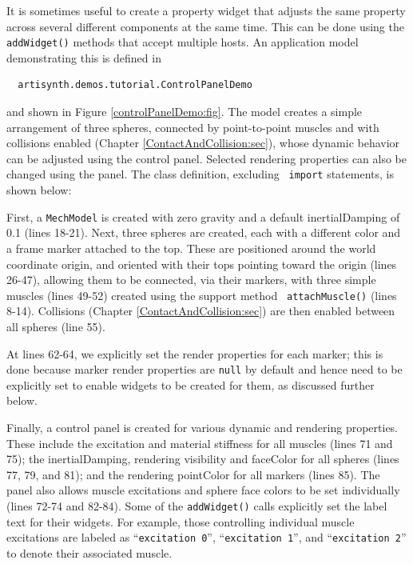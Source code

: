 It is sometimes useful to create a property widget that adjusts the
same property across several different components at the same time.
This can be done using the {\tt addWidget()} methods that accept
multiple hosts. An application model demonstrating this is defined in
%
\begin{verbatim}
  artisynth.demos.tutorial.ControlPanelDemo
\end{verbatim}
%
and shown in Figure \ref{controlPanelDemo:fig}.  The model creates a
simple arrangement of three spheres, connected by point-to-point
muscles and with collisions enabled
(Chapter \ref{ContactAndCollision:sec}), whose dynamic behavior can be
adjusted using the control panel. Selected rendering properties can
also be changed using the panel.  The class definition, excluding {\tt
import} statements, is shown below:
%
\lstset{numbers=left} 
\iflatexml

\else

\fi
\lstset{numbers=none}
%
First, a {\tt MechModel} is created with zero gravity and a default
{\sf inertialDamping} of 0.1 (lines 18-21). Next, three spheres are
created, each with a different color and a frame marker attached to
the top. These are positioned around the world coordinate origin, and
oriented with their tops pointing toward the origin (lines 26-47),
allowing them to be connected, via their markers, with three simple
muscles (lines 49-52) created using the support method {\tt
attachMuscle()} (lines 8-14). Collisions
(Chapter \ref{ContactAndCollision:sec}) are then enabled between all
spheres (line 55).

At lines 62-64, we explicitly set the render properties for each
marker; this is done because marker render properties are {\tt null}
by default and hence need to be explicitly set to enable widgets to be
created for them, as discussed further below.

Finally, a control panel is created for various dynamic and rendering
properties. These include the {\sf excitation} and material {\sf
stiffness} for all muscles (lines 71 and 75); the {\sf
inertialDamping}, rendering {\sf visibility} and {\sf faceColor} for
all spheres (lines 77, 79, and 81); and the rendering {\sf pointColor}
for all markers (lines 85). The panel also allows muscle excitations
and sphere face colors to be set individually (lines 72-74 and 82-84).
Some of the {\tt addWidget()} calls explicitly set the label text for
their widgets. For example, those controlling individual muscle
excitations are labeled as ``{\tt excitation 0}'', ``{\tt excitation
1}'', and ``{\tt excitation 2}'' to denote their associated muscle.

